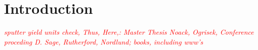 \documentclass[12pt,
paper=a4,				
DIV=calc,		  %
BCOR=16mm,	  %
headinclude,
openany
]{scrbook}
\newcommand{\TODO}[1]{{\LARGE{\textcolor{red}{\emph {#1 }}}}}
\begin{document}


\clearpage
\small{\tableofcontents}

\chapter{Introduction}
\setcounter{page}{1}
\onehalfspacing



%

%



%

%




\newpage


\TODO{
sputter yield units check, Thus, Here,: Master Thesis Noack, Ogrisek, Conference proceding D. Sage, Rutherford, Nordlund; books, including www's}

\end{document}
